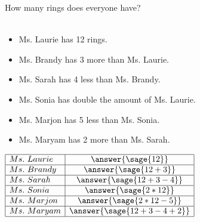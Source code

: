 \documentclass{ximera}
\begin{document}
\begin{problem}
How many rings does everyone have?
\\
\\
\begin{minipage}[c]{0.5\textwidth}
\begin{itemize}
    \item Ms. Laurie has 12 rings. 
    \item Ms. Brandy has 3 more than Ms. Laurie.
    \item Ms. Sarah has 4 less than Ms. Brandy.
    \item Ms. Sonia has double the amount of Ms. Laurie.
    \item Ms. Marjon has 5 less than Ms. Sonia.
    \item Ms. Maryam has 2 more than Ms. Sarah.
\end{itemize}
\end{minipage}
\hfill
\begin{minipage}[c]{0.3\textwidth}
$
\begin{array}{|l|c|}
\hline 
Ms.~ Laurie &  \answer{\sage{12}} \\
\hline 
Ms.~ Brandy &  \answer{\sage{12+3}}\\
\hline
Ms.~ Sarah &  \answer{\sage{12+3-4}}\\
\hline
Ms.~ Sonia &  \answer{\sage{2*12}}\\
\hline
Ms.~ Marjon &  \answer{\sage{2*12-5}}\\
\hline
Ms.~ Maryam &  \answer{\sage{12+3-4+2}}\\
\hline
\end{array}
$
\end{minipage}
\end{problem}
\end{document}

